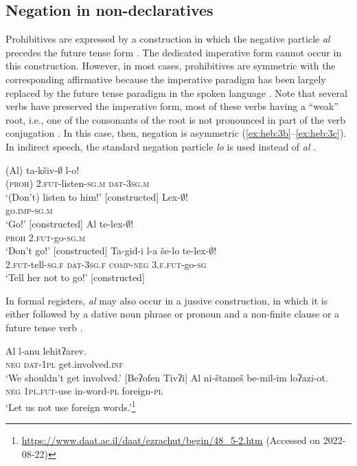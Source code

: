 \documentclass[output=paper,colorlinks,citecolor=brown]{langscibook}
\begin{document}
\subsection{Negation in non-declaratives} \label{sec:heb:2.2}

Prohibitives are expressed by a construction in which the negative particle \textit{al} precedes the future tense form . The dedicated imperative form cannot occur in this construction. However, in most cases, prohibitives are symmetric with the corresponding affirmative because the imperative paradigm has been largely replaced by the future tense paradigm in the spoken language \citep[284--285]{Glinert1989}. Note that several verbs have preserved the imperative form, most of these verbs having a “weak” root, i.e., one of the consonants of the root is not pronounced in part of the verb conjugation \citep{TheHebrewAcademy2017}. In this case, then, negation is asymmetric (\ref{ex:heb:3b}--\ref{ex:heb:3c}). In indirect speech, the standard negation particle \textit{lo} is used instead of \textit{al} .

\ea\label{ex:heb:3}
    \ea\label{ex:heb:3a}
        \gll (Al) ta-kšiv-${\emptyset}$ l-o!\\
             (\textsc{proh}) 2\textsc{.fut}{}-listen-\textsc{sg}.\textsc{m} \textsc{dat-3sg.m}\\
        \glt ‘(Don’t) listen to him!’ [constructed]
    \ex\label{ex:heb:3b}
        \gll Lex-${\emptyset}$! \\
             go.\textsc{imp-sg.m}\\
        \glt ‘Go!’ [constructed]
    \ex\label{ex:heb:3c}
        \gll Al te-lex-${\emptyset}$!\\
             \textsc{proh} \textsc{2.fut}{}-go\textsc{{}-sg.m}\\
        \glt ‘Don’t go!’ [constructed] 
    \ex\label{ex:heb:3d}
        \gll Ta{}-gid{}-i l-a še-lo te-lex{}-${\emptyset}$!\\
             \textsc{2.fut-}tell{}-\textsc{sg.f} \textsc{dat-3sg.f} \textsc{comp-neg} \textsc{3.f.fut}{}-go{}-\textsc{sg}\\
        \glt ‘Tell her not to go!’ [constructed]
    \z
\z 

In formal registers, \textit{al} may also occur in a jussive construction, in which it is either followed by a dative noun phrase or pronoun and a non-finite clause  or a future tense verb .

\ea\label{ex:heb:4}
    \ea\label{ex:heb:4a}
        \gll Al l-anu lehitʔarev.\\
             \textsc{neg} \textsc{dat-1pl} get.involved.\textsc{inf}\\
        \glt ‘We shouldn't get involved.' [Beʔofen Tivʔi] 
    \ex\label{ex:heb:4b}
        \gll Al ni-štameš be-mil-im loʔazi-ot. \\
             \textsc{neg} \textsc{1pl.fut-}use in-word-\textsc{pl} foreign-\textsc{pl}\\
        \glt ‘Let us not use foreign words.'\footnote{\url{https://www.daat.ac.il/daat/ezrachut/begin/48_5-2.htm} (Accessed on 2022-08-22)}
    \z 
\z
\end{document}
